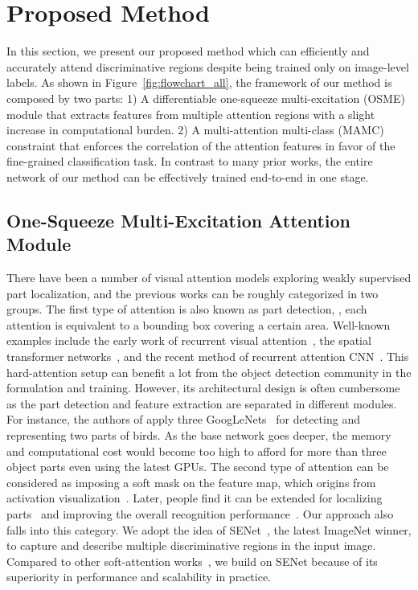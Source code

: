 \documentclass[runningheads]{llncs}
\begin{document}
\vspace{-.1in}
\section{Proposed Method}
\label{approach}

In this section, we present our proposed method which can efficiently and accurately attend discriminative regions despite being trained only on image-level labels.
As shown in Figure~\ref{fig:flowchart_all}, the framework of our method is composed by two parts:
1) A differentiable one-squeeze multi-excitation (OSME) module that extracts features from multiple attention regions with a slight increase in computational burden.
2) A multi-attention multi-class (MAMC) constraint that enforces the correlation of the attention features in favor of the fine-grained classification task.
In contrast to many prior works, the entire network of our method can be effectively trained end-to-end in one stage.



\vspace{-.1in}
\subsection{One-Squeeze Multi-Excitation Attention Module}
\label{osme}

There have been a number of visual attention models exploring weakly supervised part localization, and the previous works can be roughly categorized in two groups.
The first type of attention is also known as part detection, \ie, each attention is equivalent to a bounding box covering a certain area.
Well-known examples include the early work of recurrent visual attention~\cite{MnihHGK14}, the spatial transformer networks~\cite{jaderberg2015spatial}, and the recent method of recurrent attention CNN~\cite{fu2017look}.
This hard-attention setup can benefit a lot from the object detection community in the formulation and training.
However, its architectural design is often cumbersome as the part detection and feature extraction are separated in different modules.
For instance, the authors of \cite{jaderberg2015spatial} apply three GoogLeNets~\cite{SzegedyLJSRAEVR15} for detecting and representing two parts of birds.
As the base network goes deeper, the memory and computational cost would become too high to afford for more than three object parts even using the latest GPUs.
The second type of attention can be considered as imposing a soft mask on the feature map, which origins from activation visualization~\cite{ZeilerF14,ZhouKLOT14}.
Later, people find it can be extended for localizing parts~\cite{zhou2016learning,rosenfeld2016visual} and improving the overall recognition performance~\cite{wang2017residual,hu2017squeeze}.
Our approach also falls into this category.
We adopt the idea of SENet~\cite{hu2017squeeze}, the latest ImageNet winner, to capture and describe multiple discriminative regions in the input image.
Compared to other soft-attention works~\cite{zhou2016learning,wang2017residual}, we build on SENet because of its superiority in performance and scalability in practice.
\end{document}
